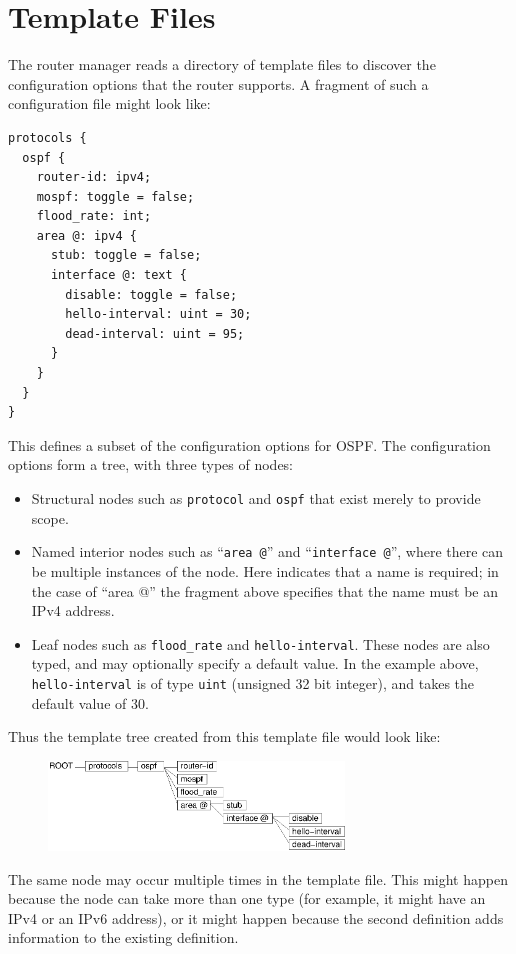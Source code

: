 \documentclass[11pt]{article}
\begin{document}
\section{Template Files}
The router manager reads a directory of template files to discover the
configuration options that the router supports.  A fragment of such a
configuration file might look like:
\begin{verbatim}
protocols {
  ospf {
    router-id: ipv4;
    mospf: toggle = false;
    flood_rate: int;
    area @: ipv4 {
      stub: toggle = false;
      interface @: text {
        disable: toggle = false;
        hello-interval: uint = 30;
        dead-interval: uint = 95;
      }
    }
  }
}
\end{verbatim}
This defines a subset of the configuration options for OSPF.  The
configuration options form a tree, with three types of nodes:
\begin{itemize}
\item Structural nodes such as {\tt protocol} and {\tt ospf} that exist
merely to provide scope.
\item Named interior nodes such as ``{\tt area @}'' and ``{\tt interface @}'',
where there can be multiple instances of the node.  Here indicates
that a name is required; in the case of ``area @'' the fragment above
specifies that the name must be an IPv4 address.
\item Leaf nodes such as  {\tt flood\_rate} and
{\tt hello-interval}.  These nodes are also typed, and may optionally
specify a default value.  In the example above, {\tt hello-interval} is
of type {\tt uint} (unsigned 32 bit integer), and takes the default value of
30.
\end{itemize}
Thus the template tree created from this template file would look
like:
\begin{figure}[htb]
\centerline{\includegraphics[width=0.7\textwidth]{figs/template}}
\vspace{.05in}
\end{figure}

The same node may occur multiple times in the template file.  This
might happen because the node can take more than one type (for
example, it might have an IPv4 or an IPv6 address), or it might happen
because the second definition adds information to the existing
definition.
\end{document}
